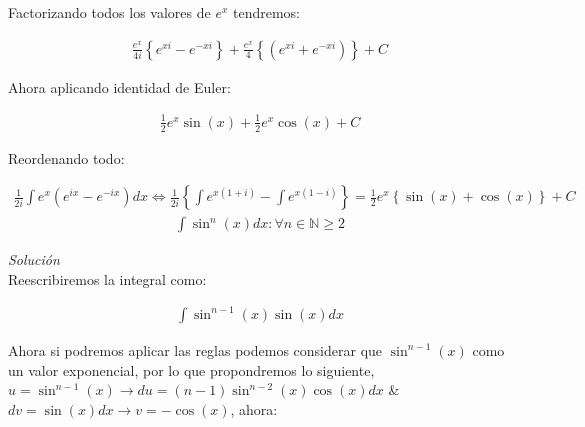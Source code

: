 Factorizando todos los valores de \(\displaystyle e^{x}\) tendremos:

\begin{equation*}
    \begin{gathered}
        \frac{e^{x}}{4i}\left\{e^{xi}-e^{-xi}\right\} + \frac{e^{x}}{4}\left\{(e^{xi}+e^{-xi})\right\}+C
    \end{gathered}
\end{equation*}

Ahora aplicando identidad de Euler:

\begin{equation*}
    \begin{gathered}
        \frac{1}{2}e^{x}\sin(x) + \frac{1}{2}e^{x}\cos(x)+C
    \end{gathered}
\end{equation*}

Reordenando todo:

\begin{equation*}
    \begin{gathered}
        \frac{1}{2i}\int e^{x}(e^{ix}-e^{-ix})dx \Leftrightarrow \frac{1}{2i}\left\{\int e^{x(1+i)} - \int e^{x(1-i)}\right\} = \frac{1}{2}e^x\left\{\sin(x)+\cos(x)\right\}+C
    \end{gathered}
\end{equation*}
\vspace{1cm}
\begin{equation}
    \begin{gathered}
        \int \sin^{n}(x)dx \colon \forall n\in\mathbb{N}\geq 2
    \end{gathered}
\end{equation}

\textit{Solución}\\

Reescribiremos la integral como:

\begin{equation*}
    \begin{gathered}
        \int \sin^{n-1}(x)\sin(x)dx
    \end{gathered}
\end{equation*}

Ahora si podremos aplicar las reglas podemos considerar que \(\displaystyle\sin^{n-1}(x)\) como un valor exponencial, por lo que propondremos lo siguiente, \(\displaystyle u=\sin^{n-1}(x) \rightarrow du=(n-1)\sin^{n-2}(x)\cos(x)dx\) \& \(\displaystyle dv = \sin(x)dx \rightarrow v=-\cos(x)\), ahora:

